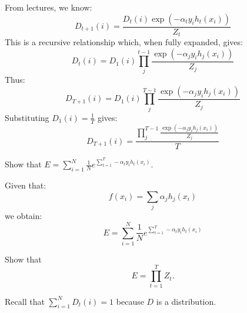 \begin{solution}
 From lectures, we know:
 \begin{equation}
     D_{t+1}(i) = \frac{D_t(i)\exp{(-\alpha_ty_ih_t(x_i))}}{Z_t}
 \end{equation}
 This is a recursive relationship which, when fully expanded, gives:
 \begin{equation}
    D_{t}(i) =D_1(i)\prod_j^{t-1}\frac{\exp{(-\alpha_jy_ih_j(x_i))}}{Z_j}
\end{equation}
Thus:
\begin{equation}
    D_{T+1}(i) =D_1(i)\prod_j^{T-1}\frac{\exp{(-\alpha_jy_ih_j(x_i))}}{Z_j}
\end{equation}
Substituting $D_1(i)=\frac{1}{T}$ gives:
\begin{equation}
    D_{T+1}(i) =\frac{\prod_j^{T-1}\frac{\exp{(-\alpha_jy_ih_j(x_i))}}{Z_j}}{T}
\end{equation}
\end{solution}

\problem[2]
Show that $E = \sum_{i=1}^N  \frac{1}{N} e^{\sum_{t=1}^T -\alpha_t y_i h_t(x_i)}.$

\begin{solution}
 Given that:
 \begin{equation}
     f(x_i) = \sum_j\alpha_jh_j(x_i)
 \end{equation}
 we obtain:
 \begin{equation}
    E = \sum_{i=1}^N  \frac{1}{N} e^{\sum_{t=1}^T -\alpha_t y_i h_t(x_i)}
 \end{equation}

\end{solution}

\problem[5]
Show that
$$E = \prod\limits_{t=1}^T Z_t.$$

\begin{hint}
	Recall that $\sum_{i = 1}^N D_t(i) = 1$ because $D$ is a distribution.
\end{hint}

